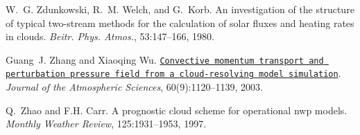 \begin{DoxyDescription}
\item[\label{_CITEREF_zdunkowski_et_al_1980}%
\mbox{[}64\mbox{]}]W.~G. Zdunkowski, R.~M. Welch, and G.~Korb. An investigation of the structure of typical two-\/stream methods for the calculation of solar fluxes and heating rates in clouds. {\itshape Beitr. Phys. Atmos.}, 53\+:147--166, 1980.


\item[\label{_CITEREF_zhang_and_wu_2003}%
\mbox{[}65\mbox{]}]Guang~J. Zhang and Xiaoqing Wu. \href{http://dx.doi.org/10.1175/1520-0469(2003)060<1120:CMTAPP>2.0.CO;2}{\tt Convective momentum transport and perturbation pressure field from a cloud-\/resolving model simulation}. {\itshape Journal of the Atmospheric Sciences}, 60(9)\+:1120--1139, 2003. 


\item[\label{_CITEREF_zhao_and_carr_1997}%
\mbox{[}66\mbox{]}]Q.~Zhao and F.\+H. Carr. A prognostic cloud scheme for operational nwp models. {\itshape Monthly Weather Review}, 125\+:1931--1953, 1997.


\end{DoxyDescription}